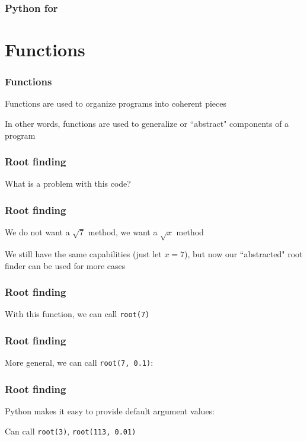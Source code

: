 \documentclass{beamer}
\begin{document}
\begin{frame}
\frametitle{Python for}



\end{frame}


\section{Functions}
\begin{frame}
\frametitle{Functions}
Functions are used to organize programs into coherent pieces

\vspace{0.2in}

In other words, functions are used to generalize or ``abstract" components of a program 
\end{frame}


\begin{frame}
\frametitle{Root finding}

What is a problem with this code?



\end{frame}

\begin{frame}
\frametitle{Root finding}
We do not want a $\sqrt{7}$ method, we want a $\sqrt{x}$ method

\vspace{0.2in}

We still have the same capabilities (just let $x = 7$), but now our ``abstracted" root finder can be used for more cases
\end{frame}


\begin{frame}
\frametitle{Root finding}

With this function, we can call \texttt{root(7)}



\end{frame}

\begin{frame}
\frametitle{Root finding}
More general, we can call \texttt{root(7, 0.1)}:



\end{frame}


\begin{frame}
\frametitle{Root finding}
Python makes it easy to provide default argument values:



Can call \texttt{root(3)}, \texttt{root(113, 0.01)}
\end{frame}
\end{document}
